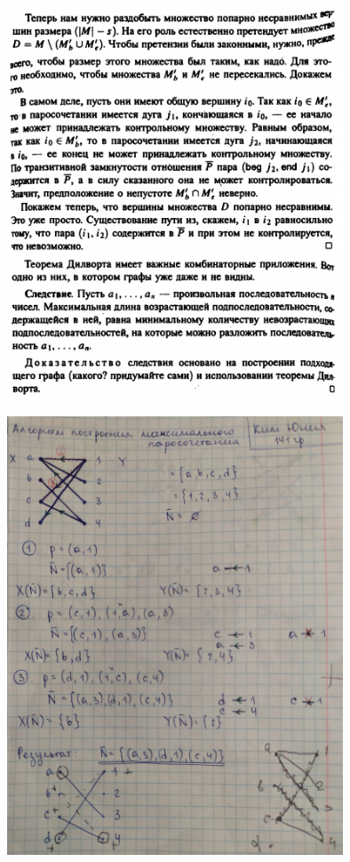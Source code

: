 \documentclass[discrete.tex]{subfiles}
\begin{document}
\begin{figure}[H]
        \includegraphics[width=10cm]{pics/49_7}
        \centering
\end{figure}

\begin{figure}[H]
        \includegraphics[width=10cm]{pics/49_8}
        \centering
\end{figure}
\end{document}
